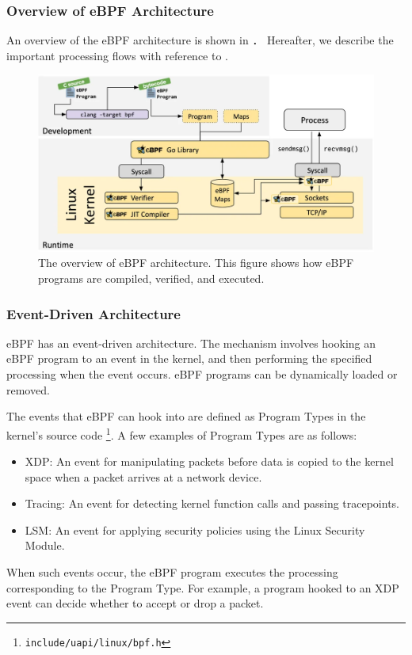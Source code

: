 \subsubsection{Overview of eBPF Architecture}
An overview of the eBPF architecture is shown in ．
Hereafter, we describe the important processing flows with reference to .
\begin{figure}[tp]
  \begin{center}
    \includegraphics[width=\columnwidth]{./img/ebpf_system.png}
  \end{center}
  \caption{The overview of eBPF architecture. This figure shows how eBPF programs are compiled, verified, and executed.
    \cite{WhatiseB29:online}}
  \label{img:ebpf-system}
\end{figure}

\subsubsection{Event-Driven Architecture}

eBPF has an event-driven architecture.
The mechanism involves hooking an eBPF program to an event in the kernel, and then
performing the specified processing when the event occurs. eBPF programs can be dynamically loaded or removed.

The events that eBPF can hook into are defined as Program Types in the kernel's source code \footnote{\texttt{include/uapi/linux/bpf.h}}.
A few examples of Program Types are as follows:
\begin{itemize}
  \item XDP: An event for manipulating packets before data is copied to the kernel space when a packet arrives at a network device.
  \item Tracing: An event for detecting kernel function calls and passing tracepoints.
  \item LSM: An event for applying security policies using the Linux Security Module.
\end{itemize}
When such events occur, the eBPF program executes the processing corresponding to the Program Type.
For example, a program hooked to an XDP event can decide whether to accept or drop a packet.

